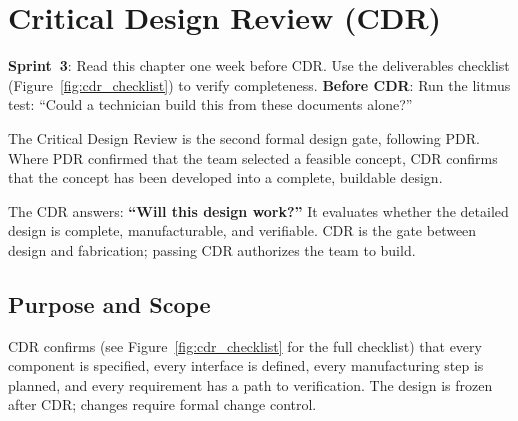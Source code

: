 \chapter{Critical Design Review (CDR)}\label{ch:cdr}

\begin{tipbox}
\textbf{Sprint~3}: Read this chapter one week before CDR. Use the deliverables checklist (Figure~\ref{fig:cdr_checklist}) to verify completeness. \textbf{Before CDR}: Run the litmus test: ``Could a technician build this from these documents alone?''
\end{tipbox}


\vspace{1em}

The Critical Design Review is the second formal design gate, following PDR. Where PDR confirmed that the team selected a feasible concept, CDR confirms that the concept has been developed into a complete, buildable design.

The CDR answers: \textbf{``Will this design work?''} It evaluates whether the detailed design is complete, manufacturable, and verifiable. CDR is the gate between design and fabrication; passing CDR authorizes the team to build.

\vspace{1em}

\section{Purpose and Scope}
CDR confirms (see Figure~\ref{fig:cdr_checklist} for the full checklist) that every component is specified, every interface is defined, every manufacturing step is planned, and every requirement has a path to verification. The design is frozen after CDR; changes require formal change control.

